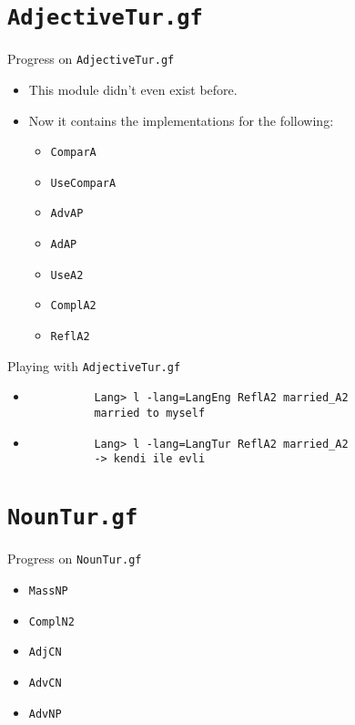 \documentclass{beamer}
\begin{document}
  \section{\texttt{AdjectiveTur.gf}}

  \begin{frame}{Progress on \texttt{AdjectiveTur.gf}}
    \begin{itemize}
      \item<1-> This module didn't even exist before.
      \item<2-> Now it contains the implementations for the following:
        \begin{itemize}
          \item \texttt{ComparA}
          \item \texttt{UseComparA}
          \item \texttt{AdvAP}
          \item \texttt{AdAP}
          \item \texttt{UseA2}
          \item \texttt{ComplA2}
          \item \texttt{ReflA2}
        \end{itemize}
    \end{itemize}
  \end{frame}

  \begin{frame}[fragile]{Playing with \texttt{AdjectiveTur.gf}}
    \begin{itemize}
      \item<1->
        \begin{lstlisting}
          Lang> l -lang=LangEng ReflA2 married_A2
          married to myself
        \end{lstlisting}
      \item<2->
        \begin{lstlisting}
          Lang> l -lang=LangTur ReflA2 married_A2
          -> kendi ile evli
        \end{lstlisting}
    \end{itemize}
  \end{frame}

  \section{\texttt{NounTur.gf}}

  \begin{frame}{Progress on \texttt{NounTur.gf}}
    \begin{itemize}
      \item \texttt{MassNP}
      \item \texttt{ComplN2}
      \item \texttt{AdjCN}
      \item \texttt{AdvCN}
      \item \texttt{AdvNP}
    \end{itemize}
  \end{frame}
\end{document}
